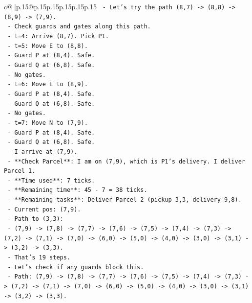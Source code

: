 \documentclass{article}
\begin{document}
{\begin{supertabular}{c@{$\;$}|p{.15\linewidth}@{}p{.15\linewidth}p{.15\linewidth}p{.15\linewidth}p{.15\linewidth}p{.15\linewidth}}
{{{\texttt{    {-}   Let's try the path (8,7) {-}> (8,8) {-}> (8,9) {-}> (7,9).} \\
\texttt{    {-}   Check guards and gates along this path.} \\
\texttt{    {-}   t=4: Arrive (8,7). Pick P1.} \\
\texttt{    {-}   t=5: Move E to (8,8).} \\
\texttt{        {-}   Guard P at (8,4). Safe.} \\
\texttt{        {-}   Guard Q at (6,8). Safe.} \\
\texttt{        {-}   No gates.} \\
\texttt{    {-}   t=6: Move E to (8,9).} \\
\texttt{        {-}   Guard P at (8,4). Safe.} \\
\texttt{        {-}   Guard Q at (6,8). Safe.} \\
\texttt{        {-}   No gates.} \\
\texttt{    {-}   t=7: Move N to (7,9).} \\
\texttt{        {-}   Guard P at (8,4). Safe.} \\
\texttt{        {-}   Guard Q at (6,8). Safe.} \\
\texttt{        {-}   I arrive at (7,9).} \\
\texttt{        {-}   **Check Parcel**: I am on (7,9), which is P1's delivery. I deliver Parcel 1.} \\
\texttt{        {-}   **Time used**: 7 ticks.} \\
\texttt{        {-}   **Remaining time**: 45 {-} 7 = 38 ticks.} \\
\texttt{        {-}   **Remaining tasks**: Deliver Parcel 2 (pickup 3,3, delivery 9,8).} \\
\texttt{        {-}   Current pos: (7,9).} \\
\texttt{        {-}   Path to (3,3):} \\
\texttt{            {-}   (7,9) {-}> (7,8) {-}> (7,7) {-}> (7,6) {-}> (7,5) {-}> (7,4) {-}> (7,3) {-}> (7,2) {-}> (7,1) {-}> (7,0) {-}> (6,0) {-}> (5,0) {-}> (4,0) {-}> (3,0) {-}> (3,1) {-}> (3,2) {-}> (3,3).} \\
\texttt{            {-}   That's 19 steps.} \\
\texttt{            {-}   Let's check if any guards block this.} \\
\texttt{            {-}   Path: (7,9) {-}> (7,8) {-}> (7,7) {-}> (7,6) {-}> (7,5) {-}> (7,4) {-}> (7,3) {-}> (7,2) {-}> (7,1) {-}> (7,0) {-}> (6,0) {-}> (5,0) {-}> (4,0) {-}> (3,0) {-}> (3,1) {-}> (3,2) {-}> (3,3).} \\
}}}
\end{supertabular}}
\end{document}
